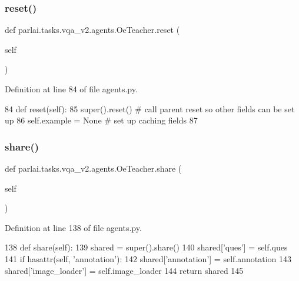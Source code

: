 \subsubsection{\texorpdfstring{reset()}{reset()}}
{\footnotesize\ttfamily def parlai.\+tasks.\+vqa\+\_\+v2.\+agents.\+Oe\+Teacher.\+reset (\begin{DoxyParamCaption}\item[{}]{self }\end{DoxyParamCaption})}



Definition at line 84 of file agents.\+py.


\begin{DoxyCode}
84     \textcolor{keyword}{def }reset(self):
85         super().reset()  \textcolor{comment}{# call parent reset so other fields can be set up}
86         self.example = \textcolor{keywordtype}{None}  \textcolor{comment}{# set up caching fields}
87 
\end{DoxyCode}
\mbox{\label{classparlai_1_1tasks_1_1vqa__v2_1_1agents_1_1OeTeacher_a578dc1b9b99fa81231ccb16975013228}} 
\subsubsection{\texorpdfstring{share()}{share()}}
{\footnotesize\ttfamily def parlai.\+tasks.\+vqa\+\_\+v2.\+agents.\+Oe\+Teacher.\+share (\begin{DoxyParamCaption}\item[{}]{self }\end{DoxyParamCaption})}



Definition at line 138 of file agents.\+py.


\begin{DoxyCode}
138     \textcolor{keyword}{def }share(self):
139         shared = super().share()
140         shared[\textcolor{stringliteral}{'ques'}] = self.ques
141         \textcolor{keywordflow}{if} hasattr(self, \textcolor{stringliteral}{'annotation'}):
142             shared[\textcolor{stringliteral}{'annotation'}] = self.annotation
143         shared[\textcolor{stringliteral}{'image\_loader'}] = self.image\_loader
144         \textcolor{keywordflow}{return} shared
145 
\end{DoxyCode}
\mbox{\label{classparlai_1_1tasks_1_1vqa__v2_1_1agents_1_1OeTeacher_afc1a8af21f49e95d90ee64af6c560f1b}} 
